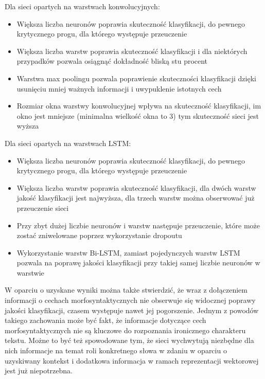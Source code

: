\noindent Dla sieci opartych na warstwach konwolucyjnych:

\begin{itemize}
    \item Większa liczba neuronów poprawia skuteczność klasyfikacji, do pewnego krytycznego progu, dla którego występuje przeuczenie
    \item Większa liczba warstw poprawia skuteczność klasyfikacji i dla niektórych przypadków pozwala osiągnąć dokładność bliską stu procent
    \item Warstwa max poolingu pozwala poprawienie skuteczności klasyfikacji dzięki usunięciu mniej ważnych informacji i uwypuklenie istotnych cech
    \item Rozmiar okna warstwy konwolucyjnej wpływa na skuteczność klasyfikacji, im okno jest mniejsze (minimalna wielkość okna to 3) tym skuteczność sieci jest wyższa
\end{itemize}

\noindent Dla sieci opartych na warstwach LSTM:
\begin{itemize}
    \item Większa liczba neuronów poprawia skuteczność klasyfikacji, do pewnego krytycznego progu, dla którego występuje przeuczenie
    \item Większa liczba warstw poprawia skuteczność klasyfikacji, dla dwóch warstw jakość klasyfikacji jest najwyższa, dla trzech warstw można obserwować już przeuczenie sieci
    \item Przy zbyt dużej liczbie neuronów i warstw następuje przeuczenie, które może zostać zniwelowane poprzez wykorzystanie dropoutu
    \item Wykorzystanie warstw Bi-LSTM, zamiast pojedynczych warstw LSTM pozwala na poprawę jakości klasyfikacji przy takiej samej liczbie neuronów w warstwie
\end{itemize}

\hfill


\noindent W oparciu o uzyskane wyniki można także stwierdzić, że wraz z dołączeniem informacji o cechach morfosyntaktycznych nie obserwuje się widocznej poprawy jakości klasyfikacji, czasem występuje nawet jej pogorszenie. Jednym z powodów takiego zachowania może być fakt, że informacje dotyczące cech morfosyntaktycznych nie są kluczowe do rozpoznania ironicznego charakteru tekstu. Możne to być też spowodowane tym, że sieci wychwytują niezbędne dla nich informacje na temat roli konkretnego słowa w zdaniu w oparciu o uzyskiwany kontekst i dodatkowa informacja w ramach reprezentacji wektorowej jest już niepotrzebna.

